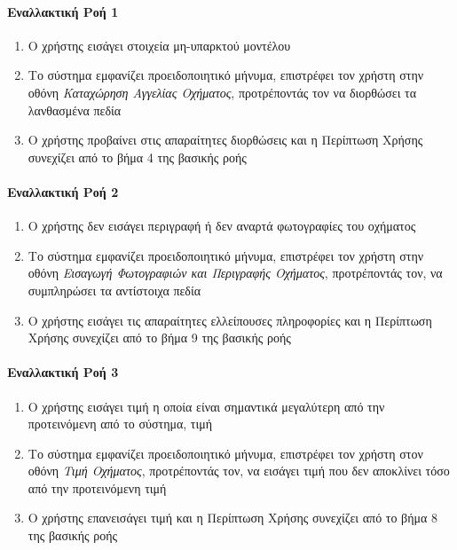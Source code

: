 \documentclass{../ol-softwaremanual}
\begin{document}
	\paragraph{Εναλλακτική Ροή 1}
	
	\begin{enumerate}
		\item O χρήστης εισάγει στοιχεία μη-υπαρκτού μοντέλου
		\item Το σύστημα εμφανίζει προειδοποιητικό μήνυμα, επιστρέφει τον χρήστη στην οθόνη \textit{Καταχώρηση Αγγελίας Οχήματος}, προτρέποντάς τον να διορθώσει τα λανθασμένα πεδία
		\item Ο χρήστης προβαίνει στις απαραίτητες διορθώσεις και η Περίπτωση Χρήσης συνεχίζει από το βήμα 4 της βασικής ροής
	\end{enumerate}
	
	\paragraph{Εναλλακτική Ροή 2}
	
	\begin{enumerate}
		\item Ο χρήστης δεν εισάγει περιγραφή ή δεν αναρτά φωτογραφίες του οχήματος
		\item Το σύστημα εμφανίζει προειδοποιητικό μήνυμα, επιστρέφει τον χρήστη στην οθόνη \textit{Εισαγωγή Φωτογραφιών και Περιγραφής Οχήματος}, προτρέποντάς τον, να συμπληρώσει τα αντίστοιχα πεδία
		\item Ο χρήστης εισάγει τις απαραίτητες ελλείπουσες πληροφορίες και η Περίπτωση Χρήσης συνεχίζει από το βήμα 9 της βασικής ροής
	\end{enumerate}
	
	\paragraph{Εναλλακτική Ροή 3}
	
	\begin{enumerate}
		\item Ο χρήστης εισάγει τιμή η οποία είναι σημαντικά μεγαλύτερη από την προτεινόμενη από το σύστημα, τιμή
		\item Το σύστημα εμφανίζει προειδοποιητικό μήνυμα, επιστρέφει τον χρήστη στον οθόνη \textit{Τιμή Οχήματος}, προτρέποντάς τον, να εισάγει τιμή που δεν αποκλίνει τόσο από την προτεινόμενη τιμή
		\item Ο χρήστης επανεισάγει τιμή και η Περίπτωση Χρήσης συνεχίζει από το βήμα 8 της βασικής ροής
	\end{enumerate}
	
\end{document}
